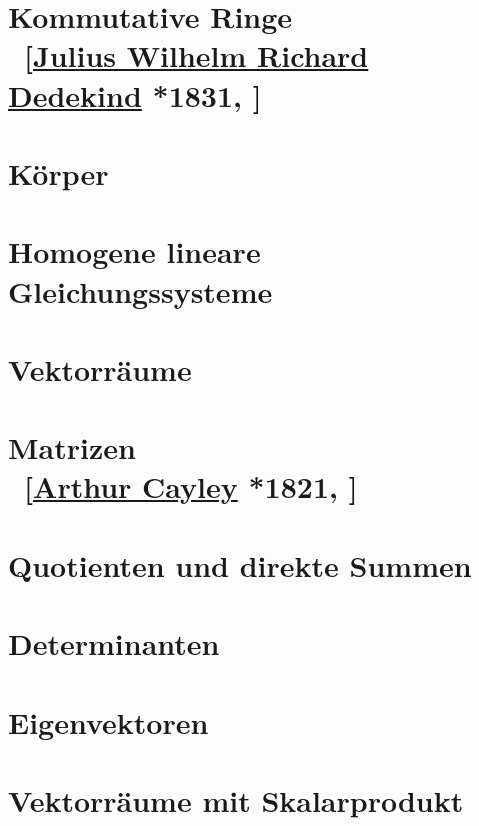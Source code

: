 \documentclass[
twoside=semi, %
fontsize=12,
DIV=12, %
cleardoublepage=current,
leqno,
headings=optiontoheadandtoc, %
toc=idx %
]{scrbook}
\theoremstyle{definition}
\begin{document}
\chapter[tocentry={Kommutative Ringe}]{Kommutative Ringe\\ ~{\small[\href{http://de.wikipedia.org/wiki/Richard_Dedekind}{Julius Wilhelm Richard Dedekind} *1831, ]}}
    

\chapter{Körper}
    
    
\chapter{Homogene lineare Gleichungssysteme}\label{5}
    
    
\chapter{Vektorräume}
    
    
\chapter[tocentry={Matrizen}]{Matrizen \\ ~\small{[\href{http://de.wikipedia.org/wiki/Arthur_Cayley}{Arthur Cayley} *1821, ]}}
    

\chapter{Quotienten und direkte Summen}
    
    
\chapter{Determinanten}
    
    
\chapter{Eigenvektoren}
    
    
\chapter{Vektorräume mit Skalarprodukt}
    
\end{document}
